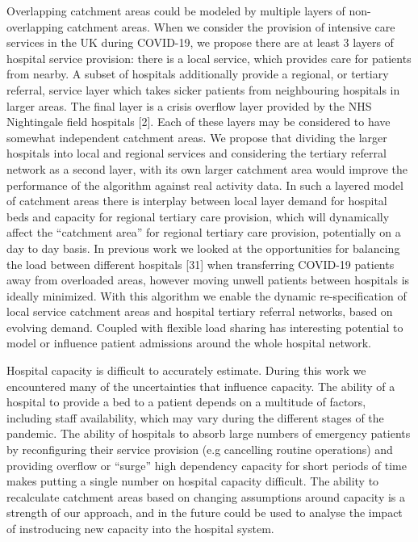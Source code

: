 \documentclass[
]{article}
\begin{document}
Overlapping catchment areas could be modeled by multiple layers of
non-overlapping catchment areas. When we consider the provision of
intensive care services in the UK during COVID-19, we propose there are
at least 3 layers of hospital service provision: there is a local
service, which provides care for patients from nearby. A subset of
hospitals additionally provide a regional, or tertiary referral, service
layer which takes sicker patients from neighbouring hospitals in larger
areas. The final layer is a crisis overflow layer provided by the NHS
Nightingale field hospitals {[}2{]}. Each of these layers may be
considered to have somewhat independent catchment areas. We propose that
dividing the larger hospitals into local and regional services and
considering the tertiary referral network as a second layer, with its
own larger catchment area would improve the performance of the algorithm
against real activity data. In such a layered model of catchment areas
there is interplay between local layer demand for hospital beds and
capacity for regional tertiary care provision, which will dynamically
affect the ``catchment area'' for regional tertiary care provision,
potentially on a day to day basis. In previous work we looked at the
opportunities for balancing the load between different hospitals
{[}31{]} when transferring COVID-19 patients away from overloaded areas,
however moving unwell patients between hospitals is ideally minimized.
With this algorithm we enable the dynamic re-specification of local
service catchment areas and hospital tertiary referral networks, based
on evolving demand. Coupled with flexible load sharing has interesting
potential to model or influence patient admissions around the whole
hospital network.

Hospital capacity is difficult to accurately estimate. During this work
we encountered many of the uncertainties that influence capacity. The
ability of a hospital to provide a bed to a patient depends on a
multitude of factors, including staff availability, which may vary
during the different stages of the pandemic. The ability of hospitals to
absorb large numbers of emergency patients by reconfiguring their
service provision (e.g cancelling routine operations) and providing
overflow or ``surge'' high dependency capacity for short periods of time
makes putting a single number on hospital capacity difficult. The
ability to recalculate catchment areas based on changing assumptions
around capacity is a strength of our approach, and in the future could
be used to analyse the impact of instroducing new capacity into the
hospital system.
\end{document}
